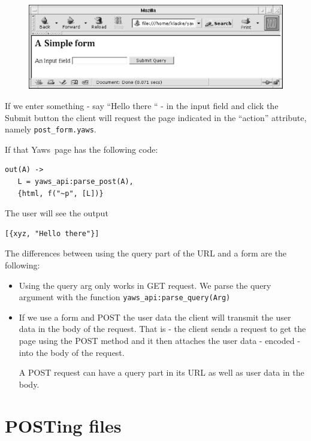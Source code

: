 \documentclass[11pt,oneside,english]{book}
\newcommand{\Yaws}            %
        {{\sc Yaws}}
\begin{document}
\begin{figure}[h]
\begin{center}

 \includegraphics[scale=0.6] {a}

\end{center}
\end{figure}



If we enter something - say ``Hello there `` -
in the input field and click the Submit button the
client will request the page indicated in the ``action'' attribute, namely
\verb+post_form.yaws+.


If that \Yaws\  page has the following code:
\begin{verbatim}
out(A) ->
   L = yaws_api:parse_post(A),
   {html, f("~p", [L])}
\end{verbatim}

The user will see the output
\begin{verbatim}
[{xyz, "Hello there"}]
\end{verbatim}

The differences between using the query part of the URL
and a form are the following:
\begin{itemize}
\item Using the query arg only works in GET request. We parse the
query argument with the function \verb+yaws_api:parse_query(Arg)+

\item If we use a form and POST the user data the client will
transmit the user data in the body of the request.
That is - the client sends a request to get the page using the POST method
and it then attaches the user data - encoded - into the body of the
request.

A POST request can have a query part in its URL as well as user data
in the body.
\end{itemize}


\section{POSTing files}
\end{document}
